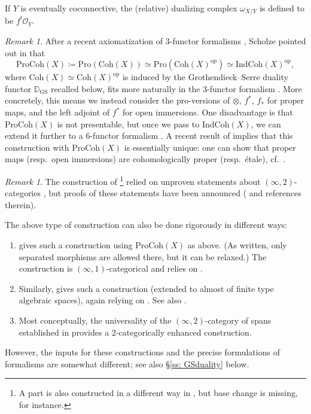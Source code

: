 \documentclass{amsart}
\theoremstyle{definition}
\theoremstyle{remark}
\newtheorem{remark}[theorem]{Remark}
\numberwithin{equation}{section}
\newcommand{\mc}{\mathcal}
\newcommand{\bb}{\mathbb}
\newcommand{\op}{\mathrm{op}}
\newcommand{\IndCoh}{\mathrm{IndCoh}}
\newcommand{\Coh}{\mathrm{Coh}}
\newcommand{\GS}{\mathrm{GS}}
\newcommand{\ProCoh}{\mathrm{ProCoh}}
\newcommand{\Pro}{\mathrm{Pro}}
\begin{document}
If $Y$ is eventually coconnective, the (relative) dualizing complex $\omega_{X/Y}$ is defined to be $f^! \mc O_Y$.  

\begin{remark}
After a recent axiomatization of 3-functor formalisms \cite[\S A.5]{MannPadic}, Scholze pointed out in \cite[Lecture VIII]{ScholzeSixFunctor} that
\[
\ProCoh(X)\coloneq \Pro(\Coh (X))\simeq \Pro(\Coh(X)^{\op}) \simeq \IndCoh(X)^{\op},  
\]
where $\Coh (X)\simeq \Coh(X)^{\op}$ is induced by the Grothendieck--Serre duality functor $\bb D_{\GS}$ recalled below, fits more naturally in the 3-functor formalism \cite[Definition 3.1.1]{HeyerMann}. More concretely, this means we instead consider the pro-versions of $\otimes$, $f^*$, $f_*$ for proper maps, and the left adjoint of $f^*$ for open immersions. One disadvantage is that $\ProCoh (X)$ is not presentable, but once we pass to $\IndCoh(X)$, we can extend it further to a 6-functor formalism \cite[Definition 3.2.1]{HeyerMann}. A recent result of \cite{DauserKuijper} implies that this construction with $\ProCoh(X)$ is essentially unique: one can show that proper maps (resp.~open immersions) are cohomologically proper (resp.~\'etale), cf.~\cite[Theorem 2.9.12]{HansenMann}.  
\end{remark}

\begin{remark}
The construction of \cite{GaitsgoryIndCohSheaves, GRI}\footnote{A part is also constructed in a different way in \cite[\S 5.4.3]{GRI}, but base change is missing, for instance.} relied on unproven statements about $(\infty, 2)$-categories \cite[\S 10.0.4.2]{GRI}, but proofs of these statements have been announced (\cite{LoubatonRuit} and references therein).   

The above type of construction can also be done rigorously in different ways:  
\begin{enumerate}
    \item \cite[Lecture VIII, Option 5]{ScholzeSixFunctor} gives such a construction using $\ProCoh(X)$ as above. (As written, only separated morphisms are allowed there, but it can be relaxed.) The construction is $(\infty, 1)$-categorical and relies on \cite{LiuZheng}. 
    \item Similarly, \cite[(9.13)]{ZhuTame} gives such a construction (extended to almost of finite type algebraic spaces), again relying on \cite{LiuZheng}. See also \cite[Remark 9.41(2)]{ZhuTame}. 
    \item Most conceptually, the universality of the $(\infty, 2)$-category of spans established in \cite{CnossenLenzLinskens} provides a 2-categorically enhanced construction. 
\end{enumerate}
However, the inputs for these constructions and the precise formulations of formalisms are somewhat different; see also \S \ref{ss: GSduality} below. 
\end{remark}
\end{document}
